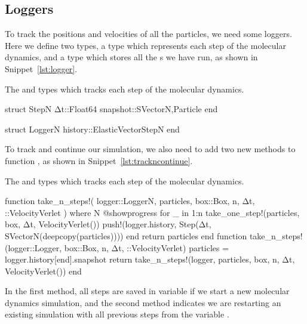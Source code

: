 \subsection{Loggers}

To track the positions and velocities of all the particles, we need some loggers.
Here we define two types, a  type which represents each step of the molecular
dynamics, and a  type which stores all the s we have run,
as shown in Snippet~\ref{lst:logger}.
%
\begin{algorithm}
    \caption{The  and  types which tracks each step of the
        molecular dynamics.}
    \label{lst:logger}
    \begin{juliacode}
        struct Step{N}
            Δt::Float64
            snapshot::SVector{N,Particle}
        end

        struct Logger{N}
            history::ElasticVector{Step{N}}
        end
    \end{juliacode}
\end{algorithm}
%
To track and continue our simulation, we also need to add two new methods to function
, as shown in Snippet~\ref{lst:trackncontinue}.
%
\begin{algorithm}
    \caption{The  and  types which tracks each step of the
        molecular dynamics.}
    \label{lst:trackncontinue}
    \begin{juliacode}
        function take_n_steps!(
            logger::Logger{N}, particles, box::Box, n, Δt, ::VelocityVerlet
        ) where {N}
            @showprogress for _ in 1:n
                take_one_step!(particles, box, Δt, VelocityVerlet())
                push!(logger.history, Step(Δt, SVector{N}(deepcopy(particles))))
            end
            return particles
        end
        function take_n_steps!(logger::Logger, box::Box, n, Δt, ::VelocityVerlet)
            particles = logger.history[end].snapshot
            return take_n_steps!(logger, particles, box, n, Δt, VelocityVerlet())
        end
    \end{juliacode}
\end{algorithm}
%
In the first method, all steps are saved in variable  if we start a new
molecular dynamics simulation, and the second method indicates we are restarting an
existing simulation with all previous steps from the variable .


